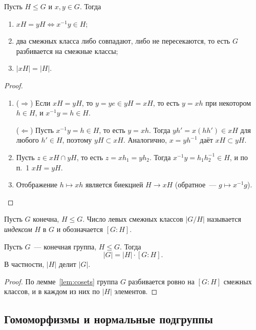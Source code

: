 \documentclass[12pt]{article}
\begin{document}
	\begin{lemma}\label{lem:cosets}
		Пусть $H \leqslant G$ и $x, y \in G$. Тогда
		\begin{enumerate}
			\item $xH = yH \Longleftrightarrow x^{-1}y \in H$;
			\item два смежных класса либо совпадают, либо не пересекаются, то есть $G$ разбивается на смежные классы;
			\item $|xH| = |H|$.
		\end{enumerate}
	\end{lemma}

	\begin{proof}
		\begin{enumerate}
			\item ($\Rightarrow$) Если $xH = yH$, то $y = ye \in yH = xH$, то есть $y = xh$ при некотором $h \in H$, и $x^{-1}y = h \in H$.

			($\Leftarrow$) Пусть $x^{-1}y = h \in H$, то есть $y = xh$. Тогда $yh' = x(hh') \in xH$ для любого $h' \in H$, поэтому $yH \subset xH$. Аналогично, $x = yh^{-1}$ даёт $xH \subset yH$.
			\item Пусть $z \in xH \cap yH$, то есть $z = xh_1 = yh_2$. Тогда $x^{-1}y = h_1h_2^{-1} \in H$, и по п.~1 $xH = yH$.
			\item Отображение $h \mapsto xh$ является биекцией $H \to xH$ (обратное~--- $g \mapsto x^{-1}g$).
		\end{enumerate}
	\end{proof}

	\begin{definition}[Индекс]
		Пусть $G$ конечна, $H \leqslant G$. Число левых смежных классов $|G/H|$ называется \emph{индексом} $H$ в $G$ и обозначается $[G : H]$.
	\end{definition}

	\begin{theorem}[Лагранжа]\label{thm:lagrange}
		Пусть $G$~--- конечная группа, $H \leqslant G$. Тогда
		\[
			|G| = |H| \cdot [G : H].
		\]
		В частности, $|H|$ делит $|G|$.
	\end{theorem}

	\begin{proof}
		По лемме~\ref{lem:cosets} группа $G$ разбивается ровно на $[G : H]$ смежных классов, и в каждом из них по $|H|$ элементов.
	\end{proof}

	\subsection{Гомоморфизмы и нормальные подгруппы}
\end{document}
